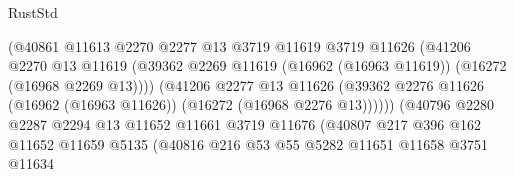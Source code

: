 \begin{lexlean}{RustStd}
\begin{coremodule}
                                        (@40861
                                          @11613
                                          @2270
                                          @2277
                                          @13
                                          @3719
                                          @11619
                                          @3719
                                          @11626
                                          (@41206
                                            @2270
                                            @13
                                            @11619
                                            (@39362
                                              @2269
                                              @11619
                                              (@16962 (@16963 @11619))
                                              (@16272 (@16968 @2269 @13))))
                                          (@41206
                                            @2277
                                            @13
                                            @11626
                                            (@39362
                                              @2276
                                              @11626
                                              (@16962 (@16963 @11626))
                                              (@16272 (@16968 @2276 @13))))))
                                      (@40796
                                        @2280
                                        @2287
                                        @2294
                                        @13
                                        @11652
                                        @11661
                                        @3719
                                        @11676
                                        (@40807
                                          @217
                                          @396
                                          @162
                                          @11652
                                          @11659
                                          @5135
                                          (@40816
                                            @216
                                            @53
                                            @55
                                            @5282
                                            @11651
                                            @11658
                                            @3751
                                            @11634

\end{coremodule}
\end{lexlean}
